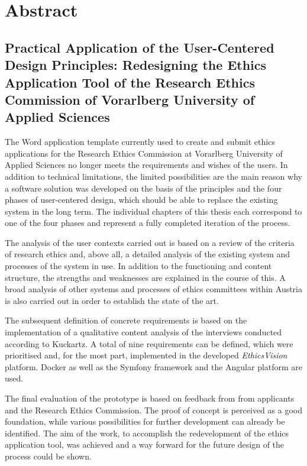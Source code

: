 \documentclass[a4paper,12pt,twoside,numbers=noendperiod]{scrreprt}
\begin{document}
\newpage
{}
\section*{Abstract}
\label{sec:abstract-en}

\subsection*{Practical Application of the User-Centered Design Principles: Redesigning the Ethics Application Tool of the Research Ethics Commission of Vorarlberg University of Applied Sciences}

The Word application template currently used to create and submit ethics applications for the Research Ethics Commission at Vorarlberg University of Applied Sciences no longer meets the requirements and wishes of the users. In addition to technical limitations, the limited possibilities are the main reason why a software solution was developed on the basis of the principles and the four phases of user-centered design, which should be able to replace the existing system in the long term. The individual chapters of this thesis each correspond to one of the four phases and represent a fully completed iteration of the process.

\smallskip

The analysis of the user contexts carried out is based on a review of the criteria of research ethics and, above all, a detailed analysis of the existing system and processes of the system in use. In addition to the functioning and content structure, the strengths and weaknesses are explained in the course of this. A broad analysis of other systems and processes of ethics committees within Austria is also carried out in order to establish the state of the art.

\smallskip

The subsequent definition of concrete requirements is based on the implementation of a qualitative content analysis of the interviews conducted according to Kuckartz. A total of nine requirements can be defined, which were prioritised and, for the most part, implemented in the developed \textit{EthicsVision} platform. Docker as well as the Symfony framework and the Angular platform are used.

\smallskip

The final evaluation of the prototype is based on feedback from from applicants and the Research Ethics Commission. The proof of concept is perceived as a good foundation, while various possibilities for further development can already be identified. The aim of the work, to accomplish the redevelopment of the ethics application tool, was achieved and a way forward for the future design of the process could be shown.
\end{document}
